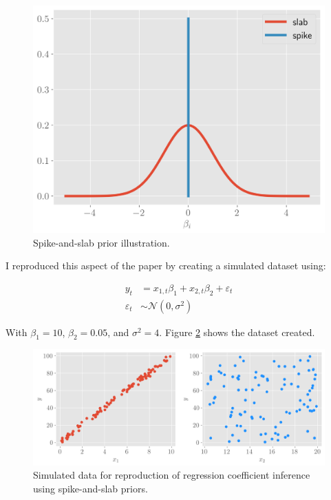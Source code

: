 \documentclass[12pt]{article}
\begin{document}
\begin{figure}[!h]
    \centering
    \includegraphics[scale=.6
    ]{../figures/spike.png}
    \caption{Spike-and-slab prior illustration.}
    \label{prior}
\end{figure}

I reproduced this aspect of the paper by creating a simulated dataset using:

\begin{align*}
    y_t& = x_{1, t}\beta_1 + x_{2, t}\beta_2 + \varepsilon_t\\
    \varepsilon_t &\sim \mathcal{N}(0, \sigma^2)
\end{align*}

With $\beta_1 = 10$,  $\beta_2 = 0.05$, and $\sigma^2 = 4$. Figure \ref{toydata} shows the dataset created. 

\begin{figure}[!h]
    \centering
    \includegraphics[scale=.6
    ]{../figures/toydata.png}
    \caption{Simulated data for reproduction of regression coefficient inference using spike-and-slab priors.}
    \label{toydata}
\end{figure}
\end{document}
